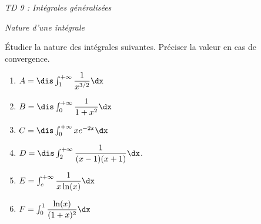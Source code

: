\documentclass[a4paper,10pt]{report}
\begin{document}
\everymath{\displaystyle}
\begin{center}
\textit{{ {\huge TD 9 : Intégrales généralisées}}}
\end{center}


\bigskip

\begin{center}
\textit{{ {\large Nature d'une intégrale}}}
\end{center}

\medskip

\begin{Exa} Étudier la nature des intégrales suivantes. Préciser la valeur en cas de convergence.

\begin{multicols}{2}
\begin{enumerate}
\item $A = \dis \int_1^{+ \infty} \dfrac{1}{x^{3/2}} \dx$
\item $B = \dis \int_0^{+ \infty} \dfrac{1}{1+x^2} \dx$
\item $C = \dis \int_0^{+ \infty} x e^{-2x} \dx$
\item $D= \dis \int_2^{+ \infty} \dfrac{1}{(x-1)(x+1)} \dx$.
\item $E= \int_{e}^{+ \infty} \dfrac{1}{x\ln(x)} \dx$
\item $F= \int_0^1 \dfrac{\ln(x)}{(1+x)^2} \dx$
\end{enumerate}
\end{multicols}
\vspace{0.1cm}
\end{Exa}

\corr 
\end{document}
